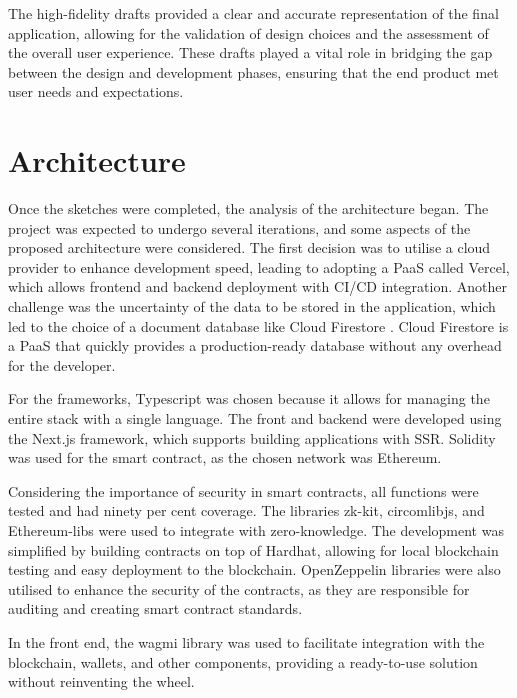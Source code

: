 The high-fidelity drafts provided a clear and accurate representation of the final application, allowing for the validation of design choices and the assessment of the overall user experience. These drafts played a vital role in bridging the gap between the design and development phases, ensuring that the end product met user needs and expectations.

\section{Architecture}
Once the sketches were completed, the analysis of the architecture began. The project was expected to undergo several iterations, and some aspects of the proposed architecture were considered. The first decision was to utilise a cloud provider to enhance development speed, leading to adopting a \ac{PaaS} called Vercel, which allows frontend and backend deployment with \ac{CI/CD} integration. Another challenge was the uncertainty of the data to be stored in the application, which led to the choice of a document database like Cloud Firestore \cite{google2020cloud_firestore}. Cloud Firestore is a \ac{PaaS} that quickly provides a production-ready database without any overhead for the developer.

For the frameworks, Typescript was chosen because it allows for managing the entire stack with a single language. The front and backend were developed using the Next.js framework, which supports building applications with \ac{SSR}. Solidity was used for the smart contract, as the chosen network was Ethereum.

Considering the importance of security in smart contracts, all functions were tested and had ninety per cent coverage. The libraries zk-kit, circomlibjs, and Ethereum-libs were used to integrate with zero-knowledge. The development was simplified by building contracts on top of Hardhat, allowing for local blockchain testing and easy deployment to the blockchain. OpenZeppelin libraries were also utilised to enhance the security of the contracts, as they are responsible for auditing and creating smart contract standards.

In the front end, the wagmi library was used to facilitate integration with the blockchain, wallets, and other components, providing a ready-to-use solution without reinventing the wheel.

